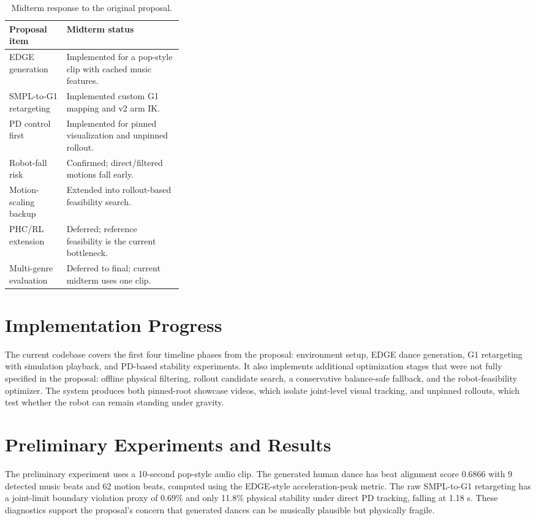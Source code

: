 \documentclass[conference]{IEEEtran}
\begin{document}
\begin{CJK*}{UTF8}{gbsn}
\begin{table}[t]
\centering
\caption{Midterm response to the original proposal.}
\label{tab:proposal-response}
\setlength{\tabcolsep}{3pt}
\begin{tabularx}{\linewidth}{p{0.33\linewidth}X}
\toprule
Proposal item & Midterm status \\
\midrule
EDGE generation & Implemented for a pop-style clip with cached music features. \\
SMPL-to-G1 retargeting & Implemented custom G1 mapping and v2 arm IK. \\
PD control first & Implemented for pinned visualization and unpinned rollout. \\
Robot-fall risk & Confirmed; direct/filtered motions fall early. \\
Motion-scaling backup & Extended into rollout-based feasibility search. \\
PHC/RL extension & Deferred; reference feasibility is the current bottleneck. \\
Multi-genre evaluation & Deferred to final; current midterm uses one clip. \\
\bottomrule
\end{tabularx}
\end{table}

\section{Implementation Progress}
The current codebase covers the first four timeline phases from the proposal: environment setup, EDGE dance generation, G1 retargeting with simulation playback, and PD-based stability experiments. It also implements additional optimization stages that were not fully specified in the proposal: offline physical filtering, rollout candidate search, a conservative balance-safe fallback, and the robot-feasibility optimizer. The system produces both pinned-root showcase videos, which isolate joint-level visual tracking, and unpinned rollouts, which test whether the robot can remain standing under gravity.

\section{Preliminary Experiments and Results}
The preliminary experiment uses a 10-second pop-style audio clip. The generated human dance has beat alignment score 0.6866 with 9 detected music beats and 62 motion beats, computed using the EDGE-style acceleration-peak metric. The raw SMPL-to-G1 retargeting has a joint-limit boundary violation proxy of 0.69\% and only 11.8\% physical stability under direct PD tracking, falling at 1.18 s. These diagnostics support the proposal's concern that generated dances can be musically plausible but physically fragile.


\end{CJK*}
\end{document}

